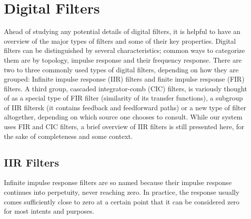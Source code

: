 %
%
\section{Digital Filters}%
\label{sec:digital_filters}

Ahead of studying  any potential details of digital filters,  it is helpful to
have  an  overview of  the  major  types of  filters  and  some of  their  key
properties.  Digital filters can  be distinguished by several characteristics;
common ways  to categorize them  are by  topology, impulse response  and their
frequency  response. There are  two to  three commonly  used types  of digital
filters, depending  on how they  are grouped: Infinite impulse  response (IIR)
filters and  finite impulse  response (FIR)  filters. A third  group, cascaded
integrator-comb (CIC)  filters, is variously thought  of as a special  type of
FIR filter (similarity of its transfer  functions), a subgroup of IIR filtersk
(it  contains  feedback  and  feedforward  paths) or  a  new  type  of  filter
altogether,  depending on  which source  one  chooses to  consult.  While  our
system uses  FIR and  CIC filters, a  brief overview of  IIR filters  is still
presented here, for the sake of completeness and some context.


%
%
\subsection{IIR Filters} %
\label{subsec:iir_filters}

Infinite impulse response filters are  so named because their impulse response
continues  into perpetuity,  never  reaching zero. In  practice, the  response
usually comes  sufficiently close to  zero at a certain  point that it  can be
considered zero for most intents and purposes.

